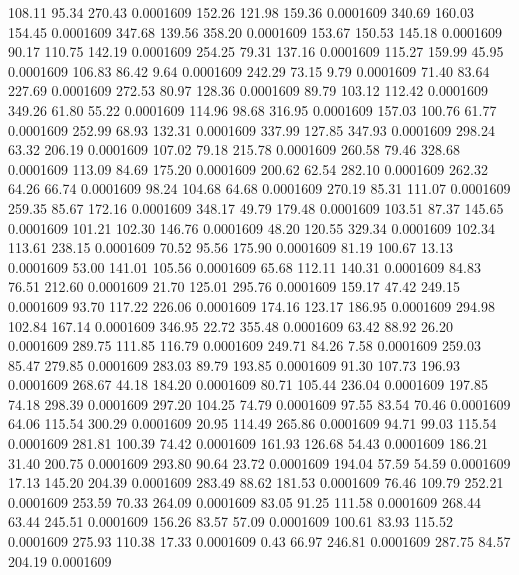  108.11   95.34  270.43   0.0001609
 152.26  121.98  159.36   0.0001609
 340.69  160.03  154.45   0.0001609
 347.68  139.56  358.20   0.0001609
 153.67  150.53  145.18   0.0001609
  90.17  110.75  142.19   0.0001609
 254.25   79.31  137.16   0.0001609
 115.27  159.99   45.95   0.0001609
 106.83   86.42    9.64   0.0001609
 242.29   73.15    9.79   0.0001609
  71.40   83.64  227.69   0.0001609
 272.53   80.97  128.36   0.0001609
  89.79  103.12  112.42   0.0001609
 349.26   61.80   55.22   0.0001609
 114.96   98.68  316.95   0.0001609
 157.03  100.76   61.77   0.0001609
 252.99   68.93  132.31   0.0001609
 337.99  127.85  347.93   0.0001609
 298.24   63.32  206.19   0.0001609
 107.02   79.18  215.78   0.0001609
 260.58   79.46  328.68   0.0001609
 113.09   84.69  175.20   0.0001609
 200.62   62.54  282.10   0.0001609
 262.32   64.26   66.74   0.0001609
  98.24  104.68   64.68   0.0001609
 270.19   85.31  111.07   0.0001609
 259.35   85.67  172.16   0.0001609
 348.17   49.79  179.48   0.0001609
 103.51   87.37  145.65   0.0001609
 101.21  102.30  146.76   0.0001609
  48.20  120.55  329.34   0.0001609
 102.34  113.61  238.15   0.0001609
  70.52   95.56  175.90   0.0001609
  81.19  100.67   13.13   0.0001609
  53.00  141.01  105.56   0.0001609
  65.68  112.11  140.31   0.0001609
  84.83   76.51  212.60   0.0001609
  21.70  125.01  295.76   0.0001609
 159.17   47.42  249.15   0.0001609
  93.70  117.22  226.06   0.0001609
 174.16  123.17  186.95   0.0001609
 294.98  102.84  167.14   0.0001609
 346.95   22.72  355.48   0.0001609
  63.42   88.92   26.20   0.0001609
 289.75  111.85  116.79   0.0001609
 249.71   84.26    7.58   0.0001609
 259.03   85.47  279.85   0.0001609
 283.03   89.79  193.85   0.0001609
  91.30  107.73  196.93   0.0001609
 268.67   44.18  184.20   0.0001609
  80.71  105.44  236.04   0.0001609
 197.85   74.18  298.39   0.0001609
 297.20  104.25   74.79   0.0001609
  97.55   83.54   70.46   0.0001609
  64.06  115.54  300.29   0.0001609
  20.95  114.49  265.86   0.0001609
  94.71   99.03  115.54   0.0001609
 281.81  100.39   74.42   0.0001609
 161.93  126.68   54.43   0.0001609
 186.21   31.40  200.75   0.0001609
 293.80   90.64   23.72   0.0001609
 194.04   57.59   54.59   0.0001609
  17.13  145.20  204.39   0.0001609
 283.49   88.62  181.53   0.0001609
  76.46  109.79  252.21   0.0001609
 253.59   70.33  264.09   0.0001609
  83.05   91.25  111.58   0.0001609
 268.44   63.44  245.51   0.0001609
 156.26   83.57   57.09   0.0001609
 100.61   83.93  115.52   0.0001609
 275.93  110.38   17.33   0.0001609
   0.43   66.97  246.81   0.0001609
 287.75   84.57  204.19   0.0001609
